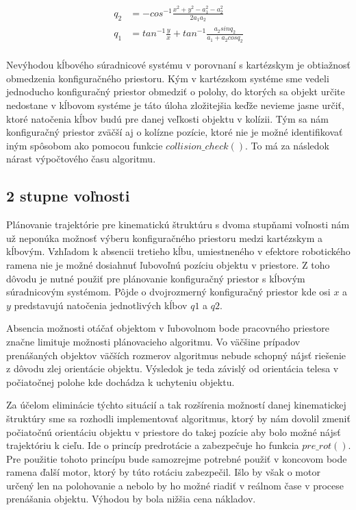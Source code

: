 \begin{equation}
	\begin{aligned}
		q_2&= - cos^{-1} \frac{x^2 + y^2 - a_1^2 - a_2^2}{2 a_1 a_2 }\\
		q_1&=  tan^{-1} \frac{y}{x} + tan^{-1} \frac{a_2 sinq_2}{a_1 + a_2 cos q_2} \\
	\end{aligned}
	\label{e4 - hore} 
\end{equation}


Nevýhodou kĺbového súradnicové systému v porovnaní s kartézskym je obtiažnosť obmedzenia konfiguračného priestoru. Kým v kartézskom systéme sme vedeli jednoducho konfiguračný priestor obmedziť o polohy, do ktorých sa objekt určite nedostane v kĺbovom systéme je táto úloha zložitejšia keďže nevieme jasne určiť, ktoré natočenia kĺbov budú pre danej veľkosti objektu v kolízii. Tým sa nám konfiguračný priestor zväčší aj o kolízne pozície, ktoré nie je možné identifikovať iným spôsobom ako pomocou funkcie $ collision\_check() $. To má za následok nárast výpočtového času algoritmu.

\subsection{2 stupne voľnosti}

Plánovanie trajektórie pre kinematickú štruktúru s dvoma stupňami voľnosti nám už neponúka možnosť výberu konfiguračného priestoru medzi kartézskym a kĺbovým. Vzhľadom k absencii tretieho kĺbu, umiestneného v efektore robotického ramena nie je možné dosiahnuť ľubovoľnú  pozíciu objektu v priestore. Z toho dôvodu je nutné použiť pre plánovanie konfiguračný priestor s kĺbovým súradnicovým systémom. Pôjde o dvojrozmerný konfiguračný priestor kde osi $ x $ a $ y $ predstavujú natočenia jednotlivých kĺbov $ q1 $ a $ q2 $.  

Absencia možnosti otáčať objektom v ľubovolnom bode pracovného priestore značne limituje možnosti plánovacieho algoritmu. Vo väčšine prípadov prenášaných objektov väčších rozmerov algoritmus nebude schopný nájsť riešenie z dôvodu zlej orientácie objektu. Výsledok je teda závislý od orientácia telesa v počiatočnej polohe kde dochádza k uchyteniu objektu. 

Za účelom eliminácie týchto situácií a tak rozšírenia možností danej kinematickej štruktúry sme sa rozhodli implementovať algoritmus, ktorý by nám dovolil zmeniť počiatočnú orientáciu objektu v priestore do takej pozície aby bolo možné nájsť trajektóriu k cieľu. Ide o princíp predrotácie a zabezpečuje ho funkcia $ pre\_rot() $. Pre použitie tohoto princípu bude samozrejme potrebné použiť v koncovom bode ramena ďalší motor, ktorý by túto rotáciu zabezpečil. Išlo by však o motor určený len na polohovanie a nebolo by ho možné riadiť v reálnom čase v procese prenášania objektu. Výhodou by bola nižšia cena nákladov.

